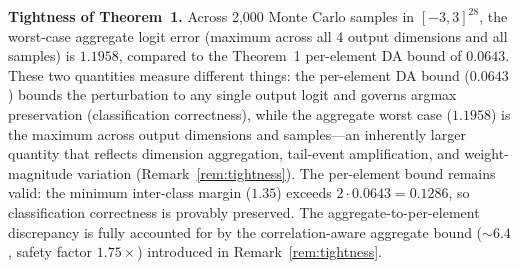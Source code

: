 \noindent\textbf{Tightness of Theorem~1.} Across 2,000 Monte Carlo samples in $[-3,3]^{28}$,
the worst-case aggregate logit error (maximum across all 4 output dimensions and all samples)
is $1.1958$, compared to the Theorem~1 per-element DA bound of $0.0643$. These two
quantities measure different things: the per-element DA bound ($0.0643$) bounds the
perturbation to any single output logit and governs argmax preservation (classification
correctness), while the aggregate worst case ($1.1958$) is the maximum across output
dimensions and samples—an inherently larger quantity that reflects dimension aggregation,
tail-event amplification, and weight-magnitude variation (Remark~\ref{rem:tightness}).
The per-element bound remains valid: the minimum inter-class margin ($1.35$) exceeds
$2 \cdot 0.0643 = 0.1286$, so classification correctness is provably preserved.
The aggregate-to-per-element discrepancy is fully accounted for by the correlation-aware
aggregate bound ($\sim 6.4$, safety factor $1.75\times$) introduced in Remark~\ref{rem:tightness}.